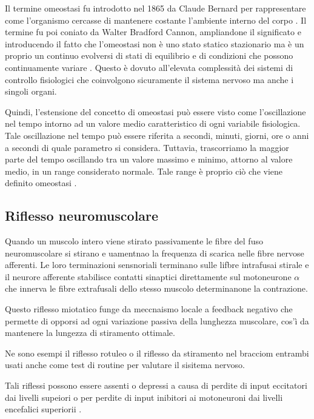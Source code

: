 Il termine omeostasi fu introdotto nel 1865 da Claude Bernard per rappresentare come l'organismo cercasse di mantenere costante l'ambiente interno del corpo \cite{bernard1957introduction}. Il termine fu poi coniato da Walter Bradford Cannon, ampliandone il significato e introducendo il fatto che l'omeostasi non è uno stato statico stazionario ma è un proprio un continuo evolversi di stati di equilibrio e di condizioni che possono continuamente variare \cite{cannon1939wisdom}. Questo è dovuto all'elevata complessità dei sistemi di controllo fisiologici che coinvolgono sicuramente il sistema nervoso ma anche i singoli organi. 

Quindi, l'estensione del concetto di omeostasi può essere visto come l'oscillazione nel tempo intorno ad un valore medio caratteristico di ogni variabile fisiologica. Tale oscillazione nel tempo può essere riferita a secondi, minuti, giorni, ore o anni a secondi di quale parametro si considera. Tuttavia, trascorriamo la maggior parte del tempo oscillando tra un valore massimo e minimo, attorno al valore medio, in un range considerato normale. Tale range è proprio ciò che viene definito omeostasi \cite{davies_adaptive_2016}. 

\subsection{Riflesso neuromuscolare}



Quando un muscolo intero viene stirato passivamente le fibre del fuso neuromuscolare si stirano e uamentnao la frequenza di scarica nelle fibre nervose afferenti. Le loro terminazioni sensnoriali terminano sulle lifbre intrafusai stirale e il neurore afferente stabilisce contatti sinaptici direttamente sul motoneurone $\alpha$ che innerva le fibre extrafusali dello stesso muscolo determinanone la contrazione. 

Questo riflesso miotatico funge da meccnaismo locale a feedback negativo che permette di opporsi ad ogni variazione passiva della lunghezza muscolare, cos'ì da mantenere la lungezza di stiramento ottimale. 

Ne sono esempi il riflesso rotuleo o il riflesso da stiramento nel bracciom entrambi usati anche come test di routine per valutare il sisitema nervoso. 

Tali riflessi possono essere assenti o depressi a causa di perdite di input eccitatori dai livelli supeiori o per perdite di input inibitori ai motoneuroni dai livelli encefalici superiorii \cite{sherwood_fisiologia_2008}.

